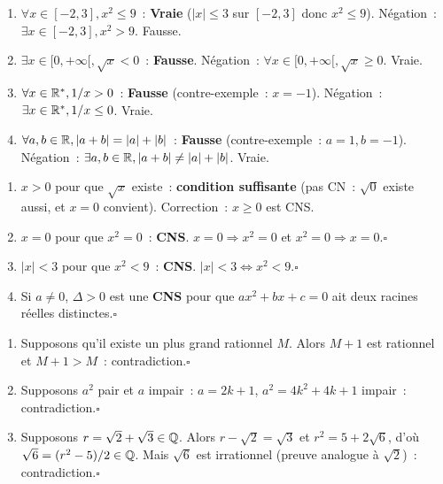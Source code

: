 
\begin{enumerate}
  \item $\forall x\in[-2,3], x^2\leq9$~: \textbf{Vraie}
        ($|x|\leq3$ sur $[-2,3]$ donc $x^2\leq9$).
        N\'egation~: $\exists x\in[-2,3], x^2>9$. Fausse.
  \item $\exists x\in[0,+\infty[, \sqrt{x}<0$~: \textbf{Fausse}.
        N\'egation~: $\forall x\in[0,+\infty[, \sqrt{x}\geq0$. Vraie.
  \item $\forall x\in\mathbb{R}^*, 1/x>0$~: \textbf{Fausse} (contre-exemple~: $x=-1$).
        N\'egation~: $\exists x\in\mathbb{R}^*, 1/x\leq0$. Vraie.
  \item $\forall a,b\in\mathbb{R}, |a+b|=|a|+|b|$~: \textbf{Fausse} (contre-exemple~: $a=1, b=-1$).
        N\'egation~: $\exists a,b\in\mathbb{R}, |a+b|\ne|a|+|b|$. Vraie.
\end{enumerate}


\begin{enumerate}
  \item $x>0$ pour que $\sqrt{x}$ existe~: \textbf{condition suffisante} (pas CN~:
        $\sqrt{0}$ existe aussi, et $x=0$ convient). Correction~: $x\geq0$ est CNS.
  \item $x=0$ pour que $x^2=0$~: \textbf{CNS}. $x=0\Rightarrow x^2=0$ et $x^2=0\Rightarrow x=0$.\hfill$\square$
  \item $|x|<3$ pour que $x^2<9$~: \textbf{CNS}. $|x|<3\Leftrightarrow x^2<9$.\hfill$\square$
  \item Si $a\ne0$, $\Delta>0$ est une \textbf{CNS} pour que
        $ax^2+bx+c=0$ ait deux racines r\'eelles distinctes.\hfill$\square$
\end{enumerate}


\begin{enumerate}
  \item Supposons qu'il existe un plus grand rationnel $M$.
        Alors $M+1$ est rationnel et $M+1>M$~: contradiction.\hfill$\square$
  \item Supposons $a^2$ pair et $a$ impair~: $a=2k+1$, $a^2=4k^2+4k+1$ impair~:
        contradiction.\hfill$\square$
  \item Supposons $r=\sqrt{2}+\sqrt{3}\in\mathbb{Q}$.
        Alors $r-\sqrt{2}=\sqrt{3}$ et $r^2=5+2\sqrt{6}$,
        d'o\`u $\sqrt{6}=(r^2-5)/2\in\mathbb{Q}$.
        Mais $\sqrt{6}$ est irrationnel (preuve analogue \`a $\sqrt{2}$)~: contradiction.\hfill$\square$
\end{enumerate}

